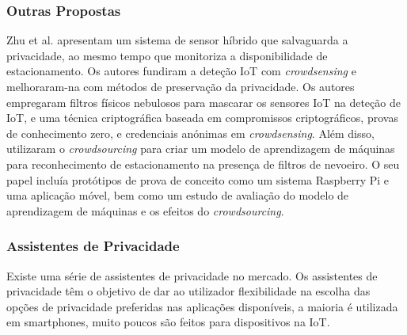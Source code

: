 \documentclass[conference]{IEEEtran}
\begin{document}
\subsubsection{Outras Propostas}

Zhu et al. \cite{ZhuIntegrating} apresentam um sistema de sensor híbrido que
salvaguarda a privacidade, ao mesmo tempo que monitoriza a disponibilidade de
estacionamento. Os autores fundiram a deteção IoT com \textit{crowdsensing}
e melhoraram-na com métodos de preservação da privacidade. Os autores empregaram
filtros físicos nebulosos para mascarar os sensores IoT na deteção de IoT,
e uma técnica criptográfica baseada em compromissos criptográficos, provas
de conhecimento zero, e credenciais anónimas em \textit{crowdsensing}. Além
disso, utilizaram o \textit{crowdsourcing} para criar um modelo de aprendizagem
de máquinas para reconhecimento de estacionamento na presença de filtros de
nevoeiro. O seu papel incluía protótipos de prova de conceito como um sistema
Raspberry Pi e uma aplicação móvel, bem como um estudo de avaliação do modelo
de aprendizagem de máquinas e os efeitos do \textit{crowdsourcing}.


\subsubsection{Assistentes de Privacidade}

Existe uma série de assistentes de privacidade no mercado. Os assistentes de
privacidade têm o objetivo de dar ao utilizador flexibilidade na escolha das
opções de privacidade preferidas nas aplicações disponíveis, a maioria é utilizada
em smartphones, muito poucos são feitos para dispositivos na IoT.
\end{document}
